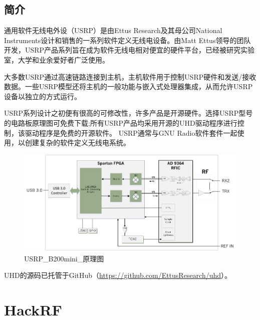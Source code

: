 		\subsection{简介}
			\par 通用软件无线电外设（USRP）是由Ettus Research及其母公司National Instruments设计和销售的一系列软件定义无线电设备。由Matt Ettus领导的团队开发，USRP产品系列旨在成为软件无线电相对便宜的硬件平台，已经被研究实验室，大学和业余爱好者广泛使用。
			\par 大多数USRP通过高速链路连接到主机，主机软件用于控制USRP硬件和发送/接收数据。一些USRP模型还将主机的一般功能与嵌入式处理器集成，从而允许USRP设备以独立的方式运行。
			\par USRP系列设计之初便有很高的可修改性，许多产品是开源硬件。选择USRP型号的电路板原理图可免费下载;所有USRP产品均采用开源的UHD驱动程序进行控制，该驱动程序是免费的开源软件。 USRP通常与GNU Radio软件套件一起使用，以创建复杂的软件定义无线电系统。\cite{ wiki:USRP}
			\begin{figure}[htb]
				\centering
				\includegraphics[width=13cm]{figures/USRP_B200mini_BD.png}
				\caption{USRP\_B200mini\_原理图}
				\label{fig:USRP_B200mini_原理图}
			\end{figure}
			\par UHD的源码已托管于GitHub（\href{https://github.com/EttusResearch/uhd}{https://github.com/EttusResearch/uhd}）。
	\section{HackRF}

